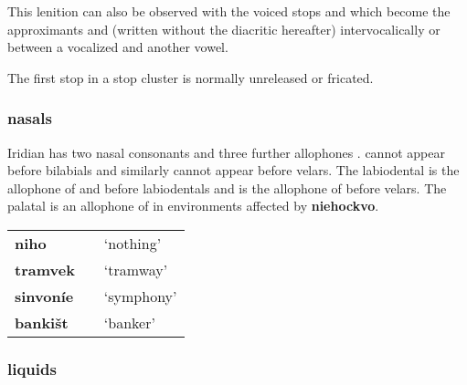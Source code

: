 \par This lenition can also be observed with the voiced stops  and  which become the approximants  and  (written without the diacritic hereafter) intervocalically or between a vocalized  and another vowel.
\xe

The first stop in a stop cluster is normally unreleased or fricated.

\xe

\subsubsection{nasals}
Iridian has two nasal consonants  and three further allophones .  cannot appear before bilabials and similarly  cannot appear before velars. The labiodental  is the allophone of  and  before labiodentals and  is the allophone of  before velars. The palatal \bt{\nn} is an allophone of  in environments affected by \textbf{niehockvo}.

\begin{center}
	\centering \small
	\begin{tabularx}{0.8\textwidth}{>{\bfseries}YYY}
		niho		&  & `nothing'\\
		tramvek		&&`tramway'\\
		sinvoníe		&&`symphony'\\
		banki\v{s}t	&  & `banker'\\
	\end{tabularx}
\end{center}
\subsubsection{liquids}

